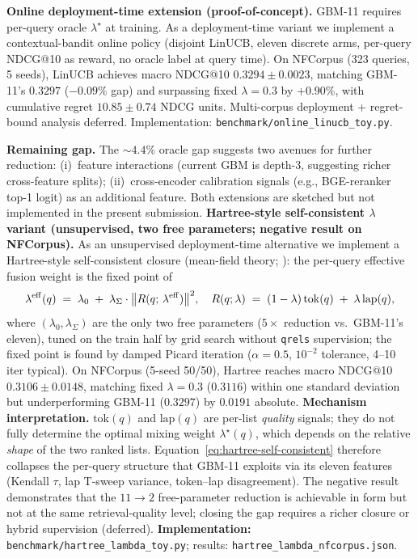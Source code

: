 \documentclass[review,1p]{elsarticle}
\begin{document}
\textbf{Online deployment-time extension (proof-of-concept).} GBM-11 requires per-query oracle $\lambda^\star$ at training. As a deployment-time variant we implement a contextual-bandit online policy (disjoint LinUCB, eleven discrete arms, per-query NDCG@10 as reward, no oracle label at query time). On NFCorpus (323 queries, 5 seeds), LinUCB achieves macro NDCG@10 $0.3294 \pm 0.0023$, matching GBM-11's $0.3297$ ($-0.09\%$ gap) and surpassing fixed $\lambda=0.3$ by $+0.90\%$, with cumulative regret $10.85 \pm 0.74$ NDCG units. Multi-corpus deployment + regret-bound analysis deferred. Implementation: \texttt{benchmark/online\_linucb\_toy.py}.

\textbf{Remaining gap.} The $\sim 4.4\%$ oracle gap suggests two avenues for further reduction: (i)~feature interactions (current GBM is depth-3, suggesting richer cross-feature splits); (ii)~cross-encoder calibration signals (e.g., BGE-reranker top-1 logit) as an additional feature. Both extensions are sketched but not implemented in the present submission.
\textbf{Hartree-style self-consistent $\lambda$ variant (unsupervised, two free parameters; negative result on NFCorpus).} As an unsupervised deployment-time alternative we implement a Hartree-style self-consistent closure (mean-field theory; \citealp{hartree1928}): the per-query effective fusion weight is the fixed point of
\begin{equation}
\label{eq:hartree-self-consistent}
\lambda^{\rm eff}(q) \;=\; \lambda_0 \;+\; \lambda_\Sigma \cdot \bigl\| R(q;\,\lambda^{\rm eff}) \bigr\|^2, \quad R(q;\lambda) \;=\; (1-\lambda)\,\mathrm{tok}(q) \;+\; \lambda\,\mathrm{lap}(q),
\end{equation}
where $(\lambda_0,\lambda_\Sigma)$ are the only two free parameters ($5\times$ reduction vs.\ GBM-11's eleven), tuned on the train half by grid search without \texttt{qrels} supervision; the fixed point is found by damped Picard iteration ($\alpha=0.5$, $10^{-2}$ tolerance, 4--10 iter typical). On NFCorpus (5-seed 50/50), Hartree reaches macro NDCG@10 $0.3106 \pm 0.0148$, matching fixed $\lambda=0.3$ ($0.3116$) within one standard deviation but underperforming GBM-11 ($0.3297$) by $0.0191$ absolute. \textbf{Mechanism interpretation.} $\mathrm{tok}(q)$ and $\mathrm{lap}(q)$ are per-list \emph{quality} signals; they do not fully determine the optimal mixing weight $\lambda^\star(q)$, which depends on the relative \emph{shape} of the two ranked lists. Equation~\eqref{eq:hartree-self-consistent} therefore collapses the per-query structure that GBM-11 exploits via its eleven features (Kendall $\tau$, lap T-sweep variance, token--lap disagreement). The negative result demonstrates that the $11 \to 2$ free-parameter reduction is achievable in form but not at the same retrieval-quality level; closing the gap requires a richer closure or hybrid supervision (deferred). \textbf{Implementation:} \texttt{benchmark/hartree\_lambda\_toy.py}; results: \texttt{hartree\_lambda\_nfcorpus.json}.
\end{document}
